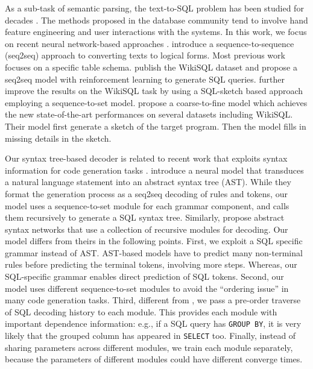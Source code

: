 \documentclass[11pt,a4paper]{article}
\begin{document}
As a sub-task of semantic parsing, the text-to-SQL problem has been studied for decades \cite{warren1982efficient,popescu2003towards,popescu2004modern,li2006constructing,giordani2012translating,wang2017synthesizing}. The methods proposed in the database community \cite{li2014constructing, Yaghmazadeh17} tend to involve hand feature engineering and user interactions with the systems. In this work, we focus on recent neural network-based approaches \cite{Yin15,Zhong2017,Xu2017,Wang2017,iyer17,Izzeddin18,suhr18}. \citet{dong16} introduce a sequence-to-sequence (seq2seq) approach to converting texts to logical forms. Most previous work focuses on a specific table schema.
\citet{Zhong2017} publish the WikiSQL dataset and propose a seq2seq model with reinforcement learning to generate SQL queries.
\citet{Xu2017} further improve the results on the WikiSQL task by using a SQL-sketch based approach employing a sequence-to-set model.
\citet{P18-1068} propose a coarse-to-fine model which achieves the new state-of-the-art performances on several datasets including WikiSQL. Their model first generate a sketch of the target program. Then the model fills in missing details in the sketch.  



Our syntax tree-based decoder is related to recent work that exploits syntax information for code generation tasks \cite{Yin17,RabinovichSK17}.
\citet{Yin17} introduce a neural model that transduces a natural language statement
into an abstract syntax tree (AST). 
While they format the generation process as a seq2seq decoding of rules and tokens, our model uses a sequence-to-set module for each grammar component, and calls them recursively to generate a SQL syntax tree.
Similarly, \citet{RabinovichSK17}
propose abstract syntax networks that use a collection of recursive modules for decoding.
Our model differs from theirs in the following points.
First, we exploit a SQL specific grammar instead of AST.
AST-based models have to predict many non-terminal rules before predicting the terminal tokens, involving more steps. Whereas, our SQL-specific grammar enables direct prediction of SQL tokens.
Second, our model uses different sequence-to-set modules to avoid the ``ordering issue'' \cite{Xu2017} in many code generation tasks. 
Third, different from \cite{RabinovichSK17}, we pass a pre-order traverse of SQL decoding history to each module. 
This provides each module with important dependence information: e.g., if a SQL query has \texttt{GROUP BY}, it is very likely that the grouped column has appeared in \texttt{SELECT} too. 
Finally, instead of sharing parameters across different modules, we train each module separately, because the parameters of different modules could have different converge times.
\end{document}
